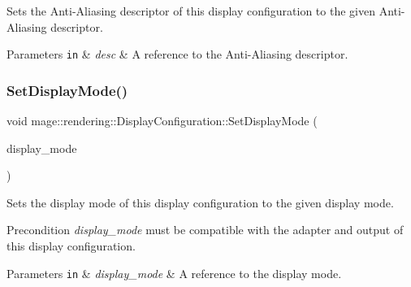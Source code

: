 Sets the Anti-\/\+Aliasing descriptor of this display configuration to the given Anti-\/\+Aliasing descriptor.


\begin{DoxyParams}[1]{Parameters}
\mbox{\tt in}  & {\em desc} & A reference to the Anti-\/\+Aliasing descriptor. \\
\hline
\end{DoxyParams}
\hypertarget{classmage_1_1rendering_1_1_display_configuration_a7cc6b9dcf3932a62bfd1416fc7b397ea}{}\label{classmage_1_1rendering_1_1_display_configuration_a7cc6b9dcf3932a62bfd1416fc7b397ea} 
\subsubsection{\texorpdfstring{Set\+Display\+Mode()}{SetDisplayMode()}}
{\footnotesize\ttfamily void mage\+::rendering\+::\+Display\+Configuration\+::\+Set\+Display\+Mode (\begin{DoxyParamCaption}\item[{const D\+X\+G\+I\+\_\+\+M\+O\+D\+E\+\_\+\+D\+E\+SC \&}]{display\+\_\+mode }\end{DoxyParamCaption})\hspace{0.3cm}{\ttfamily [noexcept]}}

Sets the display mode of this display configuration to the given display mode.

\begin{DoxyPrecond}{Precondition}
{\itshape display\+\_\+mode} must be compatible with the adapter and output of this display configuration. 
\end{DoxyPrecond}

\begin{DoxyParams}[1]{Parameters}
\mbox{\tt in}  & {\em display\+\_\+mode} & A reference to the display mode. \\
\hline
\end{DoxyParams}
\hypertarget{classmage_1_1rendering_1_1_display_configuration_a5e15cc1ca56718a7892b80cd0a1d20c0}{}\label{classmage_1_1rendering_1_1_display_configuration_a5e15cc1ca56718a7892b80cd0a1d20c0} 
